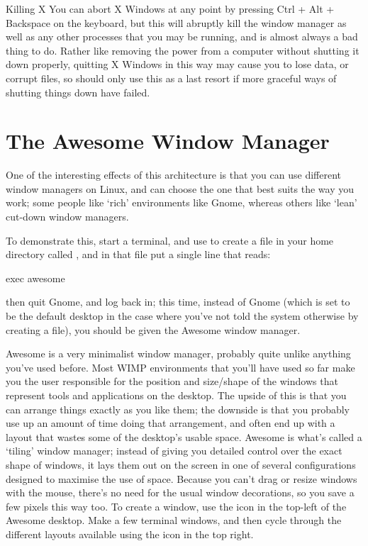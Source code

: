 \begin{danger}{Killing X}
You can abort X Windows at any point by pressing Ctrl + Alt + Backspace on the keyboard, but this will abruptly kill the window manager as well as any other processes that you may be running, and is almost always a bad thing to do. Rather like removing the power from a computer without shutting it down properly, quitting X Windows in this way may cause you to lose data, or corrupt files, so should only use this as a last resort if more graceful ways of shutting things down have failed.
\end{danger}


\section{The Awesome Window Manager}
One of the interesting effects of this architecture is that you can use different window managers on Linux, and can choose the one that best suits the way you work; some people like `rich' environments like Gnome, whereas others like `lean' cut-down window managers. 

To demonstrate this, start a terminal, and use  to create a file in your home directory called , and in that file put a single line that reads:

\begin{ttoutenv}
exec awesome
\end{ttoutenv}

then quit Gnome, and log back in; this time, instead of Gnome (which is set to be the default desktop in the case where you've not told the system otherwise by creating a  file), you should be given the Awesome window manager.

Awesome is a very minimalist window manager, probably quite unlike anything you've used before. Most WIMP environments that you'll have used so far make you the user responsible for the position and size/shape of the windows that represent tools and applications on the desktop. The upside of this is that you can arrange things exactly as you like them; the downside is that you probably use up an amount of time doing that arrangement, and often end up with a layout that wastes some of the desktop's usable space. Awesome is what's called a `tiling' window manager; instead of giving you detailed control over the exact shape of windows, it lays them out on the screen in one of several configurations designed to maximise the use of space. Because you can't drag or resize windows with the mouse, there's no need for the usual window decorations, so you save a few pixels this way too. To create a window, use the icon in the top-left of the Awesome desktop. Make a few terminal windows, and then cycle through the different layouts available using the icon in the top right. 

